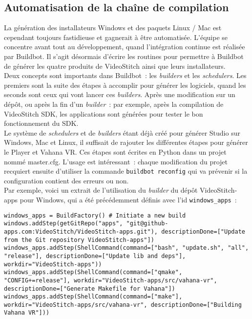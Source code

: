 \subsection{Automatisation de la chaîne de compilation}
La génération des installateurs Windows et des paquets Linux / Mac est cependant
toujours fastidieuse et gagnerait à être automatisée. L'équipe se concentre avant
tout au développement, quand l'intégration continue est réalisée par Buildbot. 
Il s'agit désormais d'écrire les routines pour permettre à Buildbot de générer
les quatre produits de VideoStitch ainsi que leurs installateurs.\\
Deux concepts sont importants dans Buildbot~: les \textit{builders} et les \textit{schedulers}.
Les premiers sont la suite des étapes à accomplir pour générer les logiciels, quand
les seconds sont ceux qui vont lancer ces \textit{builders}. Après une modification
sur un dépôt, ou après la fin d'un \textit{builder}~: par exemple, après la compilation de
VideoStitch SDK, les applications sont générées pour tester le bon fonctionnement
du SDK.\\
Le système de \textit{schedulers} et de \textit{builders} étant déjà créé pour 
générer Studio sur Windows, Mac et Linux, il suffisait de rajouter les différentes 
étapes pour générer le Player et Vahana VR. Ces étapes sont écrites en Python dans un projet nommé master.cfg.
L'usage est intéressant~: chaque modification du projet recquiert ensuite d'utiliser la commande
\texttt{buildbot reconfig} qui va prévenir si la configuration
contient des erreurs ou non.\\
\newline
Par exemple, voici un extrait de l'utilisation du \textit{builder} du dépôt VideoStitch-apps
pour Windows, qui a été précédemment définis avec l'id \texttt{windows_apps}~:
\begin{verbatim}
windows_apps = BuildFactory() # Initiate a new build
windows.addStep(getGitRepo("apps", "git@github-apps.com:VideoStitch/VideoStitch-apps.git"), descriptionDone=["Update from the Git repository VideoStitch-apps"])
windows_apps.addStep(ShellCommand(command=["bash", "update.sh", "all", "release"], descriptionDone=["Update lib and deps"], workdir="VideoStitch-apps"))
windows_apps.addStep(ShellCommand(command=["qmake", "CONFIG+=release"], workdir="VideoStitch-apps/src/vahana-vr", descriptionDone=["Generate Makefile for Vahana"])
windows_apps.addStep(ShellCommand(command=["make"], workdir="VideoStitch-apps/src/vahana-vr", descriptionDone=["Building Vahana VR"]))
\end{verbatim}

